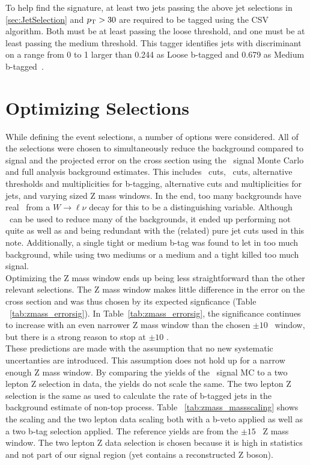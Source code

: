 To help find the \ttZ signature, at least two jets passing the above jet selections in \ref{sec:JetSelection} and $p_{\mathrm{T}} > 30$ are required to be tagged using the CSV algorithm. Both must be at least passing the loose threshold, and one must be at least passing the medium threshold.
This tagger identifies jets with discriminant on a range from 0 to 1  larger than  0.244 as Loose b-tagged and 0.679 as Medium b-tagged~\cite{btagICHEP2012twiki}.\\




\section{Optimizing Selections}
\label{sec:Optimization}

While defining the event selections, a number of options were considered. All of the selections were chosen to simultaneously reduce the  background compared to signal and the projected error on the cross section using the \ttZ \ signal Monte Carlo and full analysis background estimates. This includes \Ht \ cuts, \met \ cuts, alternative thresholds and multiplicities for b-tagging, alternative  \pt cuts and multiplicities for jets, and varying sized Z mass windows. In the end, too many backgrounds have real \met \ from a $W \rightarrow \ell \nu$ decay for this to be a distinguishing variable. Although \Ht \ can be used to reduce many of the backgrounds, it ended up performing not quite as well as and being redundant with the (related) pure jet cuts used in this note. Additionally, a single tight or medium  b-tag was found to let in too much background, while using two mediums or a medium and a tight killed too much signal.\\  

Optimizing the Z mass window ends up being less straightforward than the other relevant selections. The Z mass window makes little difference in the error on the cross section and was thus chosen by its expected signficance (Table ~\ref{tab:zmass_errorsig}). In Table~\ref{tab:zmass_errorsig}, the significance continues to increase with an even narrower Z mass window than the chosen $\pm 10$ \GeV \ window, but there is a strong reason to stop at $\pm 10$ \GeV.\\

These predictions are made with the assumption that no new systematic uncertanties are introduced. This assumption does not hold up for a narrow enough Z mass window. By comparing the yields of the \ttZ \ signal MC to a two lepton Z selection in data, the yields do not scale the same. The two lepton Z selection is the same as used to calculate the rate of b-tagged jets in the background estimate of non-top process. Table ~\ref{tab:zmass_massscaling} shows the \ttZ scaling and the two lepton data scaling both with a b-veto applied as well as a two b-tag selection applied. The reference yields are from the $\pm 15$ \GeV \ Z mass window. The two lepton Z data selection is chosen because it is high in statistics and not part of our signal region (yet contains a reconstructed Z boson).\\

